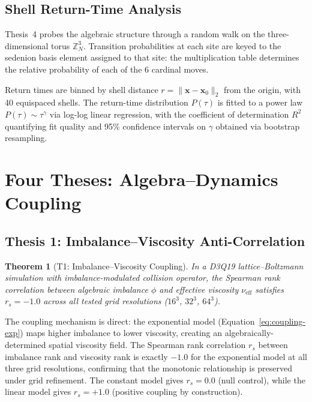 \documentclass[12pt]{article}
\theoremstyle{definition}
\theoremstyle{plain}
\newtheorem{theorem}{Theorem}[section]
\theoremstyle{remark}
\begin{document}
\subsection{Shell Return-Time Analysis}
\label{sec:shells}

Thesis~4 probes the algebraic structure through a random walk on the
three-dimensional torus $\mathbb{Z}_N^3$.  Transition probabilities at each
site are keyed to the sedenion basis element assigned to that site: the
multiplication table determines the relative probability of each of the 6
cardinal moves.

Return times are binned by shell distance $r = \|\mathbf{x} -
\mathbf{x}_0\|_2$ from the origin, with 40 equispaced shells.  The
return-time distribution $P(\tau)$ is fitted to a power law
$P(\tau) \sim \tau^\gamma$ via log-log linear regression, with the
coefficient of determination $R^2$ quantifying fit quality and 95\%
confidence intervals on $\gamma$ obtained via bootstrap resampling.

\section{Four Theses: Algebra--Dynamics Coupling}
\label{sec:theses}

\subsection{Thesis 1: Imbalance--Viscosity Anti-Correlation}
\label{sec:t1}

\begin{theorem}[T1: Imbalance--Viscosity Coupling]
In a D3Q19 lattice--Boltzmann simulation with imbalance-modulated
collision operator, the Spearman rank correlation between algebraic
imbalance $\phi$ and effective viscosity $\nu_{\mathrm{eff}}$ satisfies
$r_s = -1.0$ across all tested grid resolutions ($16^3$, $32^3$, $64^3$).
\end{theorem}

The coupling mechanism is direct: the exponential model
(Equation~\ref{eq:coupling-exp}) maps higher imbalance to lower viscosity,
creating an algebraically-determined spatial viscosity field.  The Spearman
rank correlation $r_s$ between imbalance rank and viscosity rank is
exactly $-1.0$ for the exponential model at all three grid resolutions,
confirming that the monotonic relationship is preserved under grid
refinement.  The constant model gives $r_s = 0.0$ (null control), while
the linear model gives $r_s = +1.0$ (positive coupling by construction).
\end{document}
